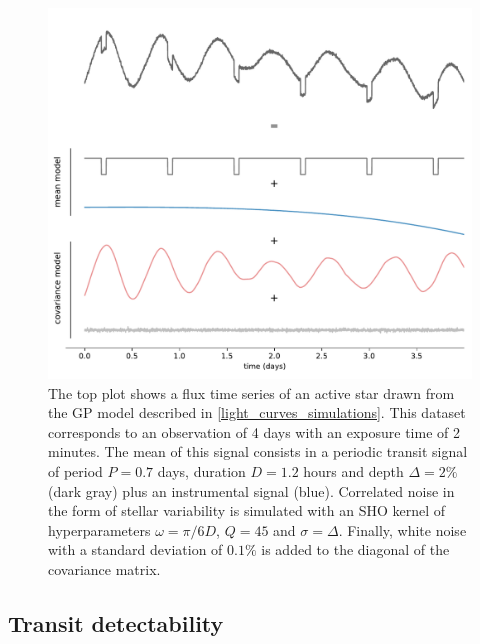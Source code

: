\documentclass[modern]{aastex631}
\begin{document}
\begin{figure}[H]
    \begin{centering}
        \includegraphics[width=\linewidth]{../workflows/principle/figures/principle_dataset_decomposed.pdf}
        \caption{The top plot shows a flux time series of an active star drawn from the GP model described in \autoref{light_curves_simulations}. This dataset corresponds to an observation of 4 days with an exposure time of 2 minutes. The mean of this signal consists in a periodic transit signal of period $P=0.7$ days, duration $D=1.2$ hours and depth $\Delta=2\%$ (dark gray) plus an instrumental signal (blue). Correlated noise in the form of stellar variability is simulated with an SHO kernel of hyperparameters $\omega = \pi / 6 D$, $Q=45$ and $\sigma = \Delta$. Finally, white noise with a standard deviation of $0.1\%$ is added to the diagonal of the covariance matrix.}
        \label{fig:app_principle_dataset}
    \end{centering}
\end{figure}
\subsection{Transit detectability}\label{transit_detectability}
\end{document}
